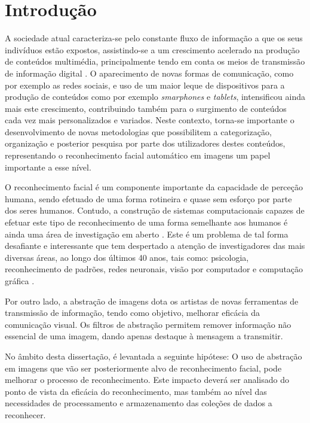 \chapter{Introdução} \label{chap:intro}

A sociedade atual caracteriza-se pelo constante fluxo de informação a que os seus indivíduos estão expostos, assistindo-se a um crescimento acelerado na produção de conteúdos multimédia, principalmente tendo em conta os meios de transmissão de informação digital \citep{IntelCorporation}. O aparecimento de novas formas de comunicação, como por exemplo as redes sociais, e uso de um maior leque de dispositivos para a produção de conteúdos como por exemplo \textit{smarphones} e \textit{tablets}, intensificou ainda mais este crescimento, contribuindo também para o surgimento de conteúdos cada vez mais personalizados e variados. Neste contexto, torna-se importante o desenvolvimento de novas metodologias que possibilitem a categorização, organização e posterior pesquisa por parte dos utilizadores destes conteúdos, representando o reconhecimento facial automático em imagens um papel importante a esse nível.

O reconhecimento facial é um componente importante da capacidade de perceção humana, sendo efetuado de uma forma rotineira e quase sem esforço por parte dos seres humanos. Contudo, a construção de sistemas computacionais capazes de efetuar este tipo de reconhecimento de uma forma semelhante aos humanos é ainda uma área de investigação em aberto \citep{Li2011, Pinto2009}. Este é um problema de tal forma desafiante e interessante que tem despertado a atenção de investigadores das mais diversas áreas, ao longo dos últimos 40 anos, tais como: psicologia, reconhecimento de padrões, redes neuronais, visão por computador e computação gráfica \citep{Zhao2003}.

Por outro lado, a abstração de imagens dota os artistas de novas ferramentas de transmissão de informação, tendo como objetivo, melhorar eficácia da comunicação visual. Os filtros de abstração permitem remover informação não essencial de uma imagem, dando apenas destaque à mensagem a transmitir. 

No âmbito desta dissertação, é levantada a seguinte hipótese: O uso de abstração em imagens que vão ser posteriormente alvo de reconhecimento facial, pode melhorar o processo de reconhecimento. Este impacto deverá ser analisado do ponto de vista da eficácia do reconhecimento, mas também ao nível das necessidades de processamento e armazenamento das coleções de dados a reconhecer.

